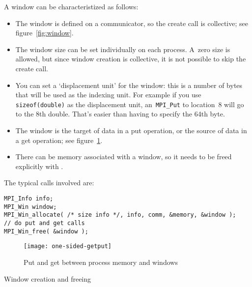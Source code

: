 A window can be characteristized as follows:
\begin{itemize}
\item The window is defined on a communicator, so the create call
  is collective; see figure~\ref{fig:window}. 
\item The window size can be set individually on each process.
  A~zero size is allowed, but since window creation is collective,
  it is not possible to skip the create call.
\item You can set a `displacement unit' for the window: this is a number of
  bytes that will be used as the indexing unit. For example if you use
  \lstinline{sizeof(double)} as the displacement unit,
  an~\lstinline{MPI_Put} to location~8 will go to the 8th double.
  That's easier than having to specify the 64th byte.
\item The window is the target of data in a put operation, or the
  source of data in a get operation; see figure~\ref{fig:putget}.
\item There can be memory associated with a window, so it needs to be
  freed explicitly with .
\end{itemize}

The typical calls involved are:
\lstset{style=reviewcode,language=C}
\begin{lstlisting}
MPI_Info info;
MPI_Win window;
MPI_Win_allocate( /* size info */, info, comm, &memory, &window );
// do put and get calls
MPI_Win_free( &window );
\end{lstlisting}

\begin{figure}[ht]
  \texttt{[image: one-sided-getput]}
  \caption{Put and get between process memory and windows}
  \label{fig:putget}
\end{figure}

 {Window creation and freeing}
\label{sec:win-alloc}

